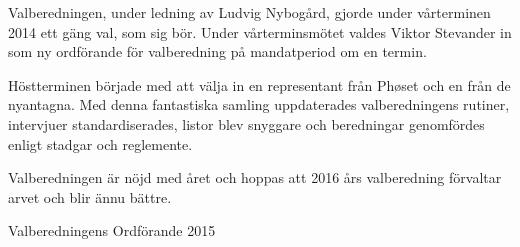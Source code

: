 \documentclass[../_main/handlingar.tex]{subfiles}
\begin{document}

Valberedningen, under ledning av Ludvig Nybogård, gjorde under vårterminen 2014 ett gäng val, som sig bör. Under vårterminsmötet valdes Viktor Stevander in som ny ordförande för valberedning på mandatperiod om en termin.

Höstterminen började med att välja in en representant från Phøset och en från de nyantagna. Med denna fantastiska samling uppdaterades valberedningens rutiner, intervjuer standardiserades, listor blev snyggare och beredningar genomfördes enligt stadgar och reglemente.

Valberedningen är nöjd med året och hoppas att 2016 års valberedning förvaltar arvet och blir ännu bättre.

\begin{signatures}{1}
    \mvh
    \signature{Viktor Stevander}{Valberedningens Ordförande 2015}
\end{signatures}
\end{document}
